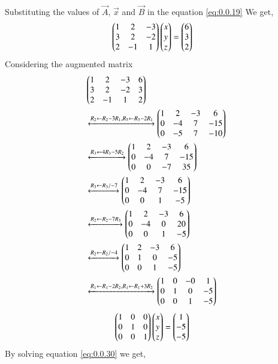 \documentclass[journal,12pt,twocolumn]{IEEEtran}
\begin{document}
\begin{enumerate}
\begin{align}
\end{align} 
Substituting the values of $\vec{A}$, $\vec{x}$ and $\vec{B}$ in the equation \eqref{eq:0.0.19}
We get,
\begin{align}
&\begin{pmatrix}1&2&-3\\3&2&-2\\2&-1&1\end{pmatrix} \begin{pmatrix}x\\y\\z\end{pmatrix}= \begin{pmatrix}6\\3\\2\end{pmatrix}
\end{align}
Considering the augmented matrix 
 \begin{align}
& \begin{pmatrix}1&2&-3&6\\3&2&-2&3\\2&-1&1&2\end{pmatrix}
 \\
&\xleftrightarrow[]{ R_2 \leftarrow R_2 - 3R_1 , R_3 \leftarrow R_3 - 2R_1}
\begin{pmatrix}1&2&-3&6\\0&-4&7&-15\\0&-5&7&-10\end{pmatrix}\\
 &\xleftrightarrow[]{ R_3 \leftarrow 4R_3 - 5R_2}
 \begin{pmatrix}1&2&-3&6\\0&-4&7&-15\\0&0&-7&35\end{pmatrix}\\
 &\xleftrightarrow[]{ R_3 \leftarrow R_3/-7}
 \begin{pmatrix}1&2&-3&6\\0&-4&7&-15\\0&0&1&-5\end{pmatrix}\\
 &\xleftrightarrow[]{ R_2 \leftarrow R_2-7R_3}
 \begin{pmatrix}1&2&-3&6\\0&-4&0&20\\0&0&1&-5\end{pmatrix}\\
 &\xleftrightarrow[]{ R_2 \leftarrow R_2/-4}
 \begin{pmatrix}1&2&-3&6\\0&1&0&-5\\0&0&1&-5\end{pmatrix}\\
 &\xleftrightarrow[]{ R_1 \leftarrow R_1-2R_2,R_1 \leftarrow R_1+3R_2}
 \begin{pmatrix}1&0&-0&1\\0&1&0&-5\\0&0&1&-5\end{pmatrix}
 \end{align}
 \begin{align}
&\myvec{1&0&0\\0&1&0\\0&0&1} \myvec{x\\y\\z}= \myvec{1\\-5\\-5}& \label{eq:0.0.30}
\medskip
\end{align}
By solving equation \eqref{eq:0.0.30} we get,

\end{enumerate}
\end{document}
